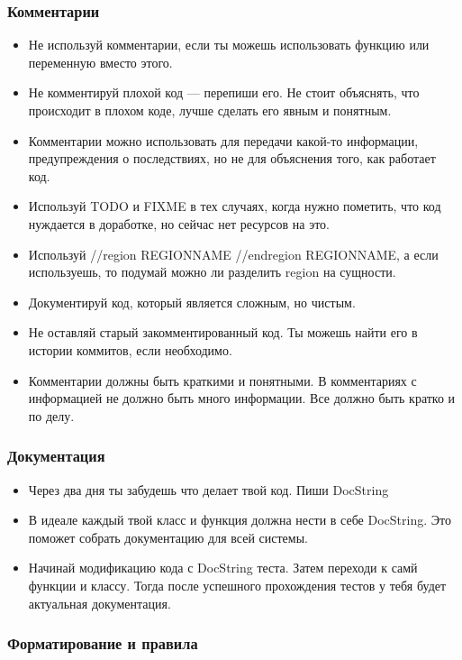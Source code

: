 \subsubsection{Комментарии}

\begin{itemize}
	\item Не используй комментарии, если ты можешь использовать функцию или переменную вместо этого.
	\item Не комментируй плохой код — перепиши его. Не стоит объяснять, что происходит в плохом коде, лучше сделать его явным и понятным.
	\item Комментарии можно использовать для передачи какой-то информации, предупреждения о последствиях, но не для объяснения того, как работает код.
	\item Используй TODO и FIXME в тех случаях, когда нужно пометить, что код нуждается в доработке, но сейчас нет ресурсов на это.
	\item Используй //region REGIONNAME //endregion REGIONNAME, а если используешь, то подумай можно ли разделить region на сущности.
	\item Документируй код, который является сложным, но чистым.
	\item Не оставляй старый закомментированный код. Ты можешь найти его в истории коммитов, если необходимо.
	\item Комментарии должны быть краткими и понятными. В комментариях с информацией не должно быть много информации. Все должно быть кратко и по делу.
\end{itemize}

\subsubsection{Документация}

\begin{itemize}
	\item Через два дня ты забудешь что делает твой код. Пиши DocString
	\item В идеале каждый твой класс и функция должна нести в себе DocString. Это поможет собрать документацию для всей системы.
	\item Начинай модификацию кода с DocString теста. Затем переходи к самй функции и классу. Тогда после успешного прохождения тестов у тебя будет актуальная документация.
\end{itemize}

\subsubsection{Форматирование и правила}

